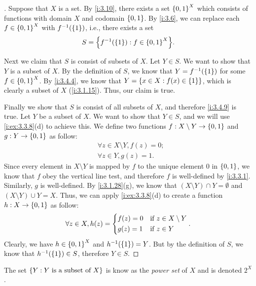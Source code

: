 \begin{proof}[]
  Suppose that \(X\) is a set.
  By \cref{i:3.10}, there exists a set \(\left\lbrace0, 1\right\rbrace^X\) which consists of functions with domain \(X\) and codomain \(\left\lbrace0, 1\right\rbrace\).
  By \cref{i:3.6}, we can replace each \(f \in \left\lbrace0, 1\right\rbrace^X\) with \(f^{-1}\pa{\set{1}}\), i.e., there exists a set
  \[
    S = \set{f^{-1}\pa{\set{1}} : f \in \set{0, 1}^X}.
  \]

  Next we claim that \(S\) is consist of subsets of \(X\).
  Let \(Y \in S\).
  We want to show that \(Y\) is a subset of \(X\).
  By the definition of \(S\), we know that \(Y = f^{-1}\pa{\set{1}}\) for some \(f \in \left\lbrace0, 1\right\rbrace^X\).
  By \cref{i:3.4.4}, we know that \(Y = \left\lbrace x \in X : f(x) \in \left\lbrace1\right\rbrace\right\rbrace\), which is clearly a subset of \(X\) (\cref{i:3.1.15}).
  Thus, our claim is true.

  Finally we show that \(S\) is consist of all subsets of \(X\), and therefore \cref{i:3.4.9} is true.
  Let \(Y\) be a subset of \(X\).
  We want to show that \(Y \in S\), and we will use \cref{i:ex:3.3.8}(d) to achieve this.
  We define two functions \(f : X \setminus Y \to \left\lbrace0, 1\right\rbrace\) and \(g : Y \to \left\lbrace0, 1\right\rbrace\) as follow:
  \begin{align*}
     & \forall z \in X \setminus Y, f(z) = 0; \\
     & \forall z \in Y, g(z) = 1.
  \end{align*}
  Since every element in \(X \setminus Y\) is mapped by \(f\) to the unique element \(0\) in \(\left\lbrace0, 1\right\rbrace\), we know that \(f\) obey the vertical line test, and therefore \(f\) is well-defined by \cref{i:3.3.1}.
  Similarly, \(g\) is well-defined.
  By \cref{i:3.1.28}(g), we know that \((X \setminus Y) \cap Y = \emptyset\) and \((X \setminus Y) \cup Y = X\).
  Thus, we can apply \cref{i:ex:3.3.8}(d) to create a function \(h : X \to \left\lbrace0, 1\right\rbrace\) as follow:
  \[
    \forall z \in X, h(z) = \begin{dcases}
      f(z) = 0 & \text{if } z \in X \setminus Y \\
      g(z) = 1 & \text{if } z \in Y
    \end{dcases}.
  \]
  Clearly, we have \(h \in \left\lbrace0, 1\right\rbrace^X\) and \(h^{-1}\pa{\set{1}} = Y\).
  But by the definition of \(S\), we know that \(h^{-1}\pa{\set{1}} \in S\), therefore \(Y \in S\).
\end{proof}

\begin{rmk}\label{i:3.4.10}
  The set \(\left\lbrace Y : Y \text{ is a subset of } X\right\rbrace\) is know as the \emph{power set} of \(X\) and is denoted \(2^X\).
\end{rmk}

